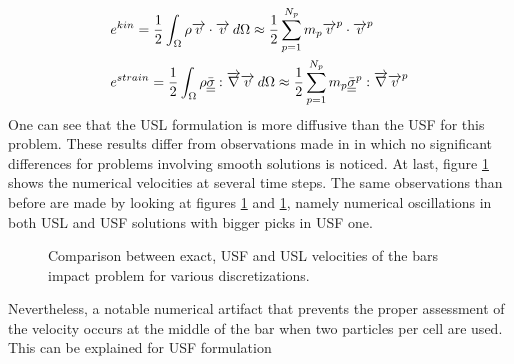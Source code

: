 \begin{align}
  & e^{kin}=\frac{1}{2}\int_\Omega \rho {\overrightarrow{v}}\cdot{\overrightarrow{v}} \:d\Omega \approx \frac{1}{2}\sum_{p=1}^{N_p} m_p {\overrightarrow{v}}^p\cdot{\overrightarrow{v}}^p\\
& e^{strain}= \frac{1}{2}\int_\Omega \rho {\underline{\underline{\bar{\sigma}}}}: {\overrightarrow{\nabla}} {\overrightarrow{v}} \:d\Omega \approx \frac{1}{2}\sum_{p=1}^{N_p} m_p {\underline{\underline{\bar{\sigma}}}}^p: {\overrightarrow{\nabla}} {\overrightarrow{v}}^p
\end{align}
One can see that the USL formulation is more diffusive than the USF for this problem. These results differ from observations made in \cite{Bardenhagen_USF_USL} in which no significant differences for problems involving smooth solutions is noticed. At last, figure \ref{fig:US_velocities} shows the numerical velocities at several time steps. The same observations than before are made by looking at figures \ref{fig:US_velocities} and \ref{fig:US_velocities}, namely numerical oscillations in both USL and USF solutions with bigger picks in USF one. 
\begin{figure}[ht]
  \centering
  { \label{subfig:US_velo_10}}
  { \label{subfig:US_velo_25}}
  \caption{Comparison between exact, USF and USL velocities of the bars impact problem for various discretizations.}
  \label{fig:US_velocities}
\end{figure}
Nevertheless, a notable numerical artifact that prevents the proper assessment of the velocity occurs at the middle of the bar when two particles per cell are used. This can be explained for USF formulation


